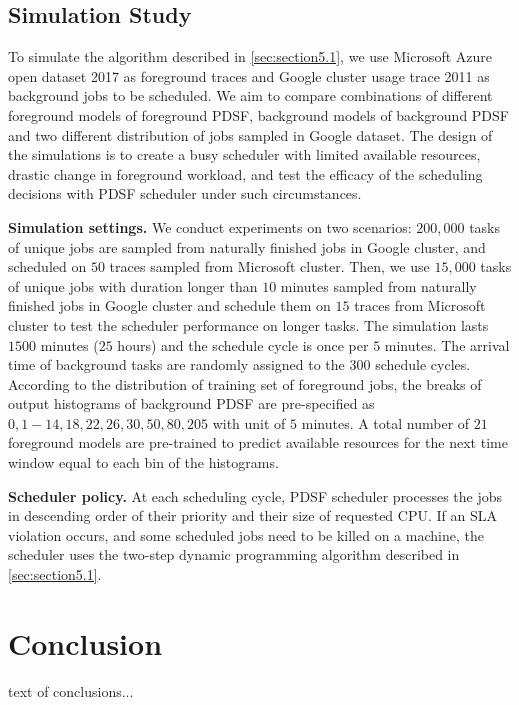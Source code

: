 \documentclass[sigplan,10pt,review,anonymous]{acmart}
\begin{document}
\subsection{Simulation Study}
\label{sec:section5.2}

To simulate the algorithm described in \cref{sec:section5.1}, we use Microsoft Azure open dataset 2017 \cite{cortez2017resource} as foreground traces and Google cluster usage trace 2011 \cite{43438} as background jobs to be scheduled. We aim to compare combinations of different foreground models of foreground PDSF, background models of background PDSF and two different distribution of jobs sampled in Google dataset. The design of the simulations is to create a busy scheduler with limited available resources, drastic change in foreground workload, and test the efficacy of the scheduling decisions with PDSF scheduler under such circumstances.

\textbf{Simulation settings.} We conduct experiments on two scenarios: $200,000$ tasks of unique jobs are sampled from naturally finished jobs in Google cluster, and scheduled on $50$ traces sampled from Microsoft cluster. Then, we use $15,000$ tasks of unique jobs with duration longer than $10$ minutes sampled from naturally finished jobs in Google cluster and schedule them on $15$ traces from Microsoft cluster to test the scheduler performance on longer tasks. The simulation lasts $1500$ minutes ($25$ hours) and the schedule cycle is once per $5$ minutes. The arrival time of background tasks are randomly assigned to the $300$ schedule cycles. According to the distribution of training set of foreground jobs, the breaks of output histograms of background PDSF are pre-specified as $0, 1-14, 18, 22, 26, 30, 50, 80, 205$ with unit of $5$ minutes. A total number of $21$ foreground models are pre-trained to predict available resources for the next time window equal to each bin of the histograms.

\textbf{Scheduler policy.} At each scheduling cycle, PDSF scheduler processes the jobs in descending order of their priority and their size of requested CPU. If an SLA violation occurs, and some scheduled jobs need to be killed on a machine, the scheduler uses the two-step dynamic programming algorithm described in \cref{sec:section5.1}.

\section{Conclusion}
text of conclusions...
\end{document}
